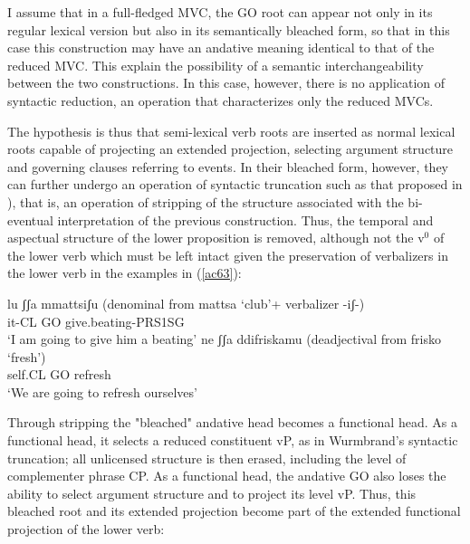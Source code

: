 \documentclass[output=paper]{langscibook}
\begin{document}
I assume that in a full-fledged MVC, the GO root can appear not only in its regular lexical version but also in its semantically bleached form, so that in this case this construction may have an andative meaning identical to that of the reduced MVC. This explain the possibility of a semantic interchangeability between the two constructions. In this case, however, there is no application of syntactic reduction, an operation that characterizes only the reduced MVCs.

The hypothesis is thus that semi-lexical verb roots are inserted as normal lexical roots capable of projecting an extended projection, selecting argument structure and governing clauses referring to events.  In their bleached form, however, they can further undergo an operation of syntactic truncation such as that proposed in \cite{wurmbrand2014a, wurmbrand2015, wurmbrand2017verb}), that is, an operation of stripping of the structure associated with the bi-eventual interpretation of the previous construction. Thus, the temporal and aspectual structure of the lower proposition is removed, although not the v$^0$ of the lower verb which must be left intact given the preservation of verbalizers in the lower verb in the examples in (\ref{ac63}):

\ea \label{ac63}
    \ea \label{ac63a}\gll lu     ʃʃa  mmattsiʃu  (denominal from mattsa ‘club’+ verbalizer -iʃ-)\\
 it-CL GO  give.beating-PRS1SG\\
 \glt ‘I am going to give him a beating’
    \ex \label{ac63b}\gll ne    ʃʃa   ddifriskamu (deadjectival from frisko ‘fresh’)\\
 self.CL  GO  refresh\\
 \glt ‘We are going to refresh ourselves’
    \z
\z

Through stripping the "bleached" andative head becomes a functional head. As a functional head, it selects a reduced constituent vP, as in Wurmbrand's syntactic truncation; all unlicensed structure is then erased, including the level of complementer  phrase CP. As a functional head, the andative GO also loses the ability to select argument structure and to project its level vP. Thus, this bleached root and its extended projection become part of the extended functional projection of the lower verb: 
\end{document}
